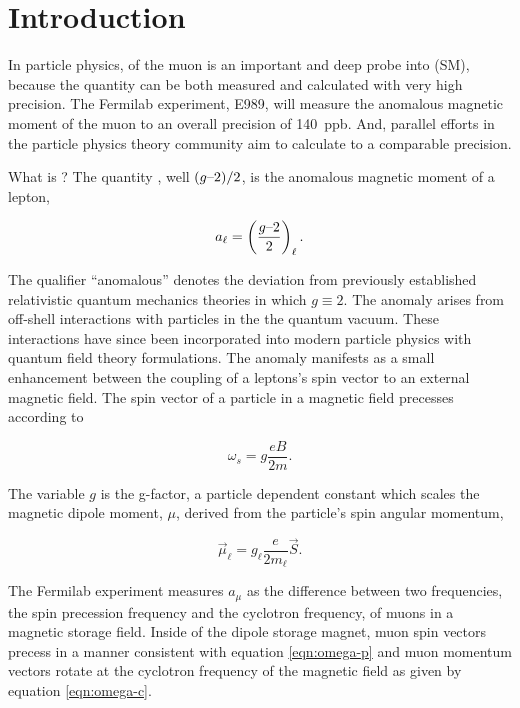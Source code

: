 \chapter {Introduction} \label{ch:intro}

In particle physics, \gmtwo of the muon is an important and deep probe into \tsm (SM), because the quantity can be both measured and calculated with very high precision.  The Fermilab \gmtwo experiment, E989, will measure the anomalous magnetic moment of the muon to an overall precision of \SI{140}{ppb}.  And, parallel efforts in the particle physics theory community aim to calculate \mugmtwo to a comparable precision.

What is \gmtwo?  The quantity \gmtwo, well $(g\hbox{--}2)/2$, is the anomalous magnetic moment of a lepton,

\begin{equation}
\label{eqn:amm-lepton}
a_\ell = \left(\frac{g\hbox{--}2}{2}\right)_\ell.
\end{equation}

\noindent
The qualifier ``anomalous'' denotes the deviation from previously established relativistic quantum mechanics theories in which $g \equiv 2$.  The anomaly arises from off-shell interactions with particles in the the quantum vacuum.  These interactions have since been incorporated into modern particle physics with quantum field theory formulations.  The anomaly manifests as a small enhancement between the coupling of a leptons's spin vector to an external magnetic field.  The spin vector of a particle in a magnetic field precesses according to 

\begin{equation}
\label{eqn:omega-p}
\omega_{s} = g \frac{e B}{2 m}.
\end{equation}

\noindent
The variable $g$ is the g-factor, a particle dependent constant which scales the magnetic dipole moment, $\mu$, derived from the particle's spin angular momentum, 

\begin{equation}
\label{eqn:muon-mu}
\vec{\mu}_\ell = g_\ell \frac{e}{2 m_\ell} \vec{S}.
\end{equation}

The Fermilab \gmtwo experiment measures $a_\mu$ as the difference between two frequencies, the spin precession frequency and the cyclotron frequency, of muons in a magnetic storage field.  Inside of the dipole storage magnet, muon spin vectors precess in a manner consistent with equation \ref{eqn:omega-p} and muon momentum vectors rotate at the cyclotron frequency of the magnetic field as given by equation \ref{eqn:omega-c}. 

